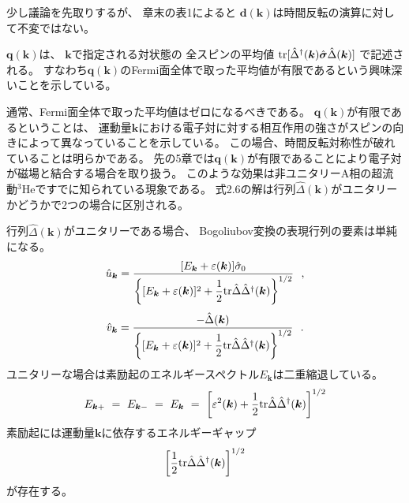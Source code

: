 \documentclass[uplatex,a4j,12pt,dvipdfmx]{jsarticle}
\begin{document}
${}$

少し議論を先取りするが、
章末の表1によると
$\bm{d}(\bm{k})$は時間反転の演算に対して不変ではない。

$\bm{q}(\bm{k})$は、
$\bm{k}$で指定される対状態の
全スピンの平均値
${\rm tr}[\hat{\Delta}^{\dagger}(\bm{k}) \hat{\bm{\sigma}} \hat{\Delta}(\bm{k}) ]$
で記述される。
すなわち$\bm{q}(\bm{k})$のFermi面全体で取った平均値が有限であるという興味深いことを示している。

通常、Fermi面全体で取った平均値はゼロになるべきである。
$\bm{q}(\bm{k})$が有限であるということは、
運動量$\bm{k}$における電子対に対する相互作用の強さがスピンの向きによって異なっていることを示している。
この場合、時間反転対称性が破れていることは明らかである。
先の5章では$\bm{q}(\bm{k})$が有限であることにより電子対が磁場と結合する場合を取り扱う。
このような効果は非ユニタリーA相の超流動$^{3}$Heですでに知られている現象である。
式2.6の解は行列$\hat{\Delta}(\bm{k})$がユニタリーかどうかで2つの場合に区別される。

行列$\hat{\Delta}(\bm{k})$がユニタリーである場合、
Bogoliubov変換の表現行列の要素は単純になる。
\[
	\hat{u}_{\bm{k}}
	=
	\dfrac{ [ E_{\bm{k}} + \varepsilon(\bm{k}) ] \hat{\sigma}_{0} }
	{ \left\{ [ E_{\bm{k}} + \varepsilon(\bm{k}) ]^{2} + \dfrac{1}{2} {\rm tr} \hat{\Delta} \hat{\Delta}^{\dagger}(\bm{k}) \right\}^{1/2} }
	\ \ ,
\]\[
	\hat{v}_{\bm{k}}
	=
	\dfrac{ - \hat{\Delta}(\bm{k}) }
	{ \left\{ [ E_{\bm{k}} + \varepsilon(\bm{k}) ]^{2} + \dfrac{1}{2} {\rm tr} \hat{\Delta} \hat{\Delta}^{\dagger}(\bm{k}) \right\}^{1/2} }
	\ \ .
\]
ユニタリーな場合は素励起のエネルギースペクトル$E_{\bm{k}}$は二重縮退している。
\[
	E_{\bm{k}+}
	\ = \
	E_{\bm{k}-}
	\ = \
	E_{\bm{k}}
	\ = \
	\left[ \varepsilon^{2}(\bm{k}) + \dfrac{1}{2} {\rm tr} \hat{\Delta} \hat{\Delta}^{\dagger}(\bm{k}) \right]^{1/2}
\]
素励起には運動量$\bm{k}$に依存するエネルギーギャップ
$$
	\left[ \dfrac{1}{2} {\rm tr} \hat{\Delta} \hat{\Delta}^{\dagger}(\bm{k}) \right]^{1/2}
$$
が存在する。

${}$
\end{document}

